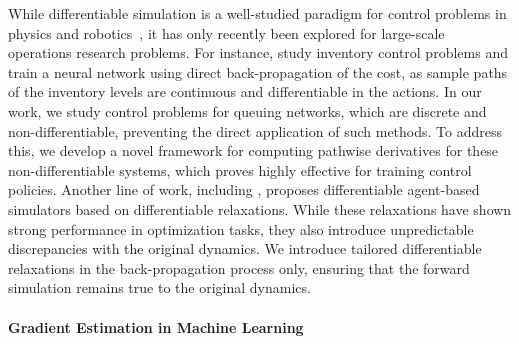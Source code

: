 While differentiable simulation is a well-studied paradigm for control problems in physics and robotics~\cite{heiden2021neuralsim, hu2019difftaichi, suh2022differentiable, howell2022dojo, schoenholz2020jax}, it has only recently been explored for large-scale operations research problems. For instance, \cite{madeka2022deep,alvo2023neural} study inventory control problems and train a neural network using direct back-propagation of the cost, as sample paths of the inventory levels are continuous and differentiable in the actions. In our work, we study control problems for queuing networks, which are discrete and non-differentiable, preventing the direct application of such methods. To address this, we develop a novel framework for computing pathwise derivatives for these non-differentiable systems, which proves highly effective for training control policies. Another line of work, including \cite{andelfinger2021differentiable, andelfinger2023towards}, proposes differentiable agent-based simulators based on differentiable relaxations. While these relaxations have shown strong performance in optimization tasks, they also introduce unpredictable discrepancies with the original dynamics. We introduce tailored differentiable relaxations in the back-propagation process only, ensuring that the forward simulation remains true to the original dynamics. 

\paragraph{Gradient Estimation in Machine Learning}

